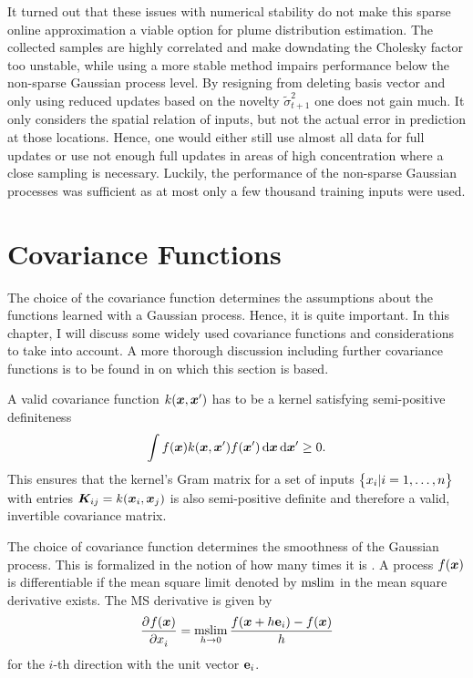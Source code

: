 It turned out that these issues with numerical stability do not make this sparse 
online approximation a viable option for plume distribution estimation. The 
collected samples are highly correlated and make downdating the Cholesky factor 
too unstable, while using a more stable method impairs performance below the 
non-sparse Gaussian process level. By resigning from deleting basis vector and 
only using reduced updates based on the novelty $\tilde{\sigma}^2_{t+1}$ one 
does not gain much. It only considers the spatial relation of inputs, but not 
the actual error in prediction at those locations. Hence, one would either still 
use almost all data for full updates or use not enough full updates in areas of 
high concentration where a close sampling is necessary. Luckily, the performance 
of the non-sparse Gaussian processes was sufficient as at most only a few 
thousand training inputs were used.

\section{Covariance Functions}\label{sec:covfn}
The choice of the covariance function determines the assumptions about the 
functions learned with a Gaussian process. Hence, it is quite important. In this 
chapter, I will discuss some widely used covariance functions and considerations 
to take into account. A more thorough discussion including further covariance 
functions is to be found in \textcite[Chapter 4]{Rasmussen:2006vz} on which this 
section is based.

A valid covariance function $k(\bm{x}, \bm{x}')$ has to be a kernel 
\parencite{Cressie:1993uu} satisfying semi-positive definiteness
\begin{equation}
    \int f(\vc x) k(\vc x, \vc x') f(\vc x') \dif \vc x \dif \vc x' \geq 
    0 \text{.}
\end{equation}
This ensures that the kernel's Gram matrix for a set of inputs $\cbr{x_i 
    | i = 1, \dots, n}$ with entries $\bm{K}_{ij} = k(\bm{x}_i, \bm{x}_j)$ is also 
semi-positive definite and therefore a valid, invertible covariance matrix.

The choice of covariance function determines the smoothness of the Gaussian 
process. This is formalized in the notion of how many times it is 
. A process $f(\bm{x})$ 
is differentiable if the mean square limit denoted by $\operatorname*{mslim}$ in the mean 
square derivative exists. The MS derivative is given by
\begin{equation}
    \dpd{f(\vc x)}{x_i} = \mslim_{h \rightarrow 0} \frac{f(\vc x + h\vcc e_i) 
    - f(\vc x)}{h}
\end{equation}
for the $i$-th direction with the unit vector $\textbf{e}_i$.

